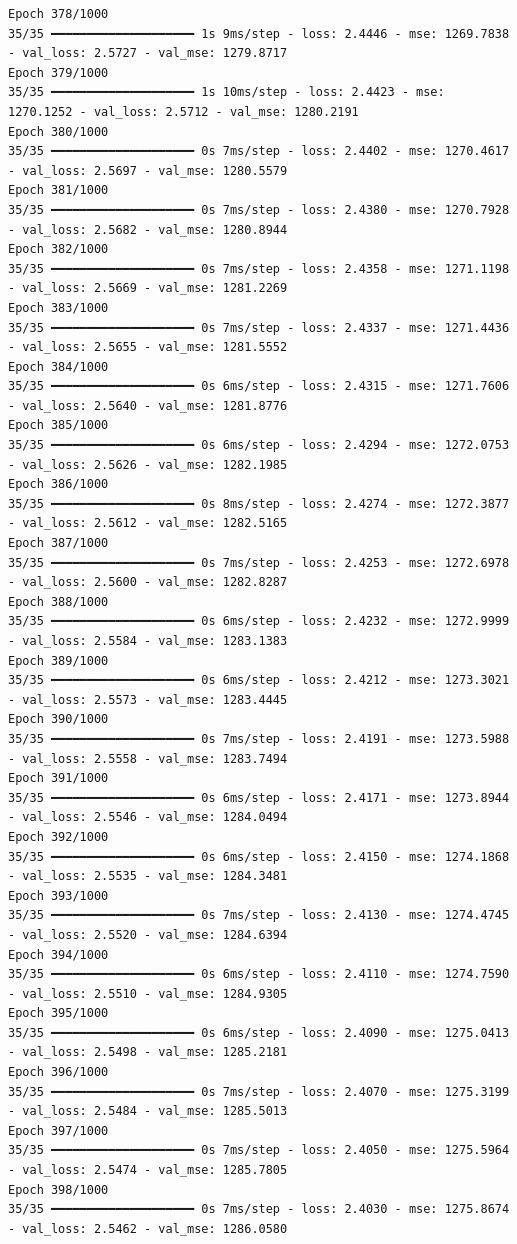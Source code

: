 \documentclass[
  letterpaper,
  DIV=11,
  numbers=noendperiod]{scrreprt}
\begin{document}
\begin{verbatim}
Epoch 378/1000
35/35 ━━━━━━━━━━━━━━━━━━━━ 1s 9ms/step - loss: 2.4446 - mse: 1269.7838 - val_loss: 2.5727 - val_mse: 1279.8717
Epoch 379/1000
35/35 ━━━━━━━━━━━━━━━━━━━━ 1s 10ms/step - loss: 2.4423 - mse: 1270.1252 - val_loss: 2.5712 - val_mse: 1280.2191
Epoch 380/1000
35/35 ━━━━━━━━━━━━━━━━━━━━ 0s 7ms/step - loss: 2.4402 - mse: 1270.4617 - val_loss: 2.5697 - val_mse: 1280.5579
Epoch 381/1000
35/35 ━━━━━━━━━━━━━━━━━━━━ 0s 7ms/step - loss: 2.4380 - mse: 1270.7928 - val_loss: 2.5682 - val_mse: 1280.8944
Epoch 382/1000
35/35 ━━━━━━━━━━━━━━━━━━━━ 0s 7ms/step - loss: 2.4358 - mse: 1271.1198 - val_loss: 2.5669 - val_mse: 1281.2269
Epoch 383/1000
35/35 ━━━━━━━━━━━━━━━━━━━━ 0s 7ms/step - loss: 2.4337 - mse: 1271.4436 - val_loss: 2.5655 - val_mse: 1281.5552
Epoch 384/1000
35/35 ━━━━━━━━━━━━━━━━━━━━ 0s 6ms/step - loss: 2.4315 - mse: 1271.7606 - val_loss: 2.5640 - val_mse: 1281.8776
Epoch 385/1000
35/35 ━━━━━━━━━━━━━━━━━━━━ 0s 6ms/step - loss: 2.4294 - mse: 1272.0753 - val_loss: 2.5626 - val_mse: 1282.1985
Epoch 386/1000
35/35 ━━━━━━━━━━━━━━━━━━━━ 0s 8ms/step - loss: 2.4274 - mse: 1272.3877 - val_loss: 2.5612 - val_mse: 1282.5165
Epoch 387/1000
35/35 ━━━━━━━━━━━━━━━━━━━━ 0s 7ms/step - loss: 2.4253 - mse: 1272.6978 - val_loss: 2.5600 - val_mse: 1282.8287
Epoch 388/1000
35/35 ━━━━━━━━━━━━━━━━━━━━ 0s 6ms/step - loss: 2.4232 - mse: 1272.9999 - val_loss: 2.5584 - val_mse: 1283.1383
Epoch 389/1000
35/35 ━━━━━━━━━━━━━━━━━━━━ 0s 6ms/step - loss: 2.4212 - mse: 1273.3021 - val_loss: 2.5573 - val_mse: 1283.4445
Epoch 390/1000
35/35 ━━━━━━━━━━━━━━━━━━━━ 0s 7ms/step - loss: 2.4191 - mse: 1273.5988 - val_loss: 2.5558 - val_mse: 1283.7494
Epoch 391/1000
35/35 ━━━━━━━━━━━━━━━━━━━━ 0s 6ms/step - loss: 2.4171 - mse: 1273.8944 - val_loss: 2.5546 - val_mse: 1284.0494
Epoch 392/1000
35/35 ━━━━━━━━━━━━━━━━━━━━ 0s 6ms/step - loss: 2.4150 - mse: 1274.1868 - val_loss: 2.5535 - val_mse: 1284.3481
Epoch 393/1000
35/35 ━━━━━━━━━━━━━━━━━━━━ 0s 7ms/step - loss: 2.4130 - mse: 1274.4745 - val_loss: 2.5520 - val_mse: 1284.6394
Epoch 394/1000
35/35 ━━━━━━━━━━━━━━━━━━━━ 0s 6ms/step - loss: 2.4110 - mse: 1274.7590 - val_loss: 2.5510 - val_mse: 1284.9305
Epoch 395/1000
35/35 ━━━━━━━━━━━━━━━━━━━━ 0s 6ms/step - loss: 2.4090 - mse: 1275.0413 - val_loss: 2.5498 - val_mse: 1285.2181
Epoch 396/1000
35/35 ━━━━━━━━━━━━━━━━━━━━ 0s 7ms/step - loss: 2.4070 - mse: 1275.3199 - val_loss: 2.5484 - val_mse: 1285.5013
Epoch 397/1000
35/35 ━━━━━━━━━━━━━━━━━━━━ 0s 7ms/step - loss: 2.4050 - mse: 1275.5964 - val_loss: 2.5474 - val_mse: 1285.7805
Epoch 398/1000
35/35 ━━━━━━━━━━━━━━━━━━━━ 0s 7ms/step - loss: 2.4030 - mse: 1275.8674 - val_loss: 2.5462 - val_mse: 1286.0580

\end{verbatim}
\end{document}

